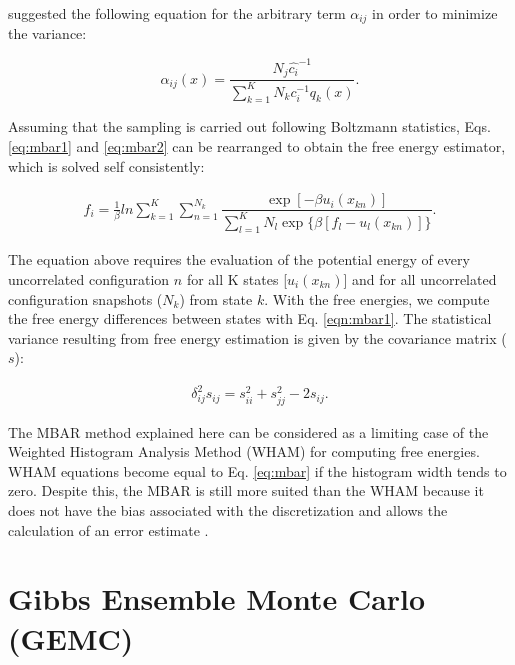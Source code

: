  suggested the following equation for the arbitrary term $\alpha _{ij}$ in order to minimize the variance:

\begin{equation}
\label{eq:mbar2}
\alpha _{ij} (x) = \frac{N_{j} \hat{c_{i}} ^{-1}}{\sum_{k=1}^{K} N_{k} c_{i} ^{-1} q_{k}(x)} .
\end{equation}

Assuming that the sampling is carried out following Boltzmann statistics, Eqs. \eqref{eq:mbar1} and \eqref{eq:mbar2} can be rearranged to obtain the free energy estimator, which is solved self consistently:  

\begin{equation}
\label{eq:mbar}
\begin{aligned}
f_{i} = \frac{1}{\beta}ln \sum_{k=1}^{K} \sum_{n=1}^{N_{k}}
\dfrac{\exp[-\beta u_{i}(x_{kn})]}{\sum_{l=1}^{K} N_{l} \exp \lbrace \beta [f_{l} - u_{l}(x_{kn})] \rbrace} .
\end{aligned}
\end{equation}

The equation above requires the evaluation of the potential energy  of every  uncorrelated configuration $n$ for all K states [$u_{i}(x_{kn})$] and for all uncorrelated configuration snapshots ($N_{k}$) from state $k$. With the free energies, we compute the free energy differences between states with Eq. \ref{eqn:mbar1}. The statistical variance resulting from free energy estimation is given by the covariance matrix ($s$):

\begin{equation}
\begin{aligned}
\delta _{ij}^{2} s_{ij} = s_{ii}^{2} + s_{jj}^{2} - 2 s_{ij}.
\end{aligned}
\end{equation}

The MBAR method explained here can be considered as a limiting case of the 
Weighted Histogram Analysis Method (WHAM) \cite{wham} for computing free energies. WHAM equations become equal to Eq. \eqref{eq:mbar} if the histogram width tends to zero. Despite this, the MBAR is still more suited than the WHAM because it does not have the bias associated with the discretization and allows the calculation of an error estimate \cite{mbar}.

\section{Gibbs Ensemble Monte Carlo (GEMC)}\label{gemc}

